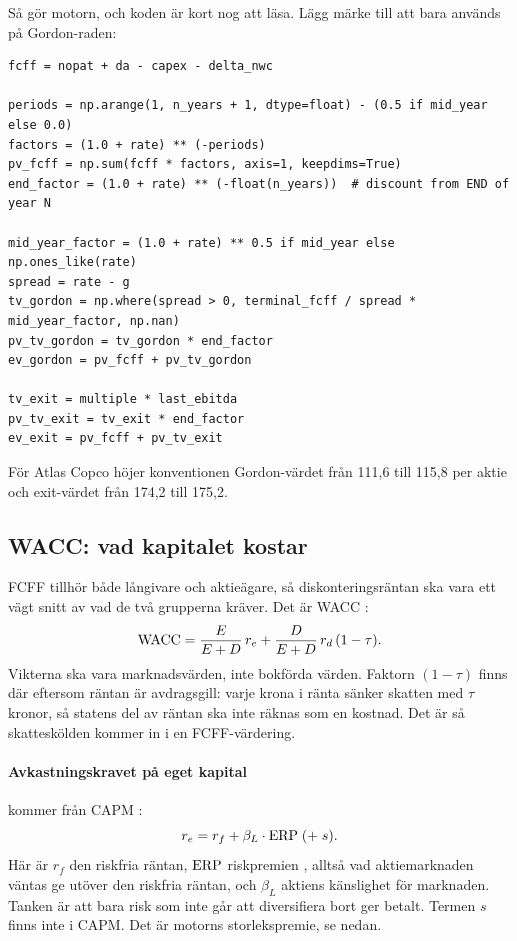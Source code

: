 Så gör motorn, och koden är kort nog att läsa. Lägg märke till att  bara
används på Gordon-raden:

\begin{lstlisting}[caption={Ur \texttt{dcf\_core} i \texttt{models/dcf.py} (förkortat).},label=lst:dcf]
fcff = nopat + da - capex - delta_nwc

periods = np.arange(1, n_years + 1, dtype=float) - (0.5 if mid_year else 0.0)
factors = (1.0 + rate) ** (-periods)
pv_fcff = np.sum(fcff * factors, axis=1, keepdims=True)
end_factor = (1.0 + rate) ** (-float(n_years))  # discount from END of year N

mid_year_factor = (1.0 + rate) ** 0.5 if mid_year else np.ones_like(rate)
spread = rate - g
tv_gordon = np.where(spread > 0, terminal_fcff / spread * mid_year_factor, np.nan)
pv_tv_gordon = tv_gordon * end_factor
ev_gordon = pv_fcff + pv_tv_gordon

tv_exit = multiple * last_ebitda
pv_tv_exit = tv_exit * end_factor
ev_exit = pv_fcff + pv_tv_exit
\end{lstlisting}

För Atlas Copco höjer konventionen Gordon-värdet från 111,6 till 115,8\kr{} per aktie och
exit-värdet från 174,2 till 175,2\kr.

\subsection{WACC: vad kapitalet kostar}
\label{sec:wacc}

FCFF tillhör både långivare och aktieägare, så diskonteringsräntan ska vara ett vägt snitt av
vad de två grupperna kräver. Det är WACC :
\begin{equation}
  \mathrm{WACC} = \frac{E}{E+D}\, r_e + \frac{D}{E+D}\, r_d\,(1-\tau).
  \label{eq:wacc}
\end{equation}
Vikterna ska vara marknadsvärden, inte bokförda värden. Faktorn $(1-\tau)$ finns där eftersom
räntan är avdragsgill: varje krona i ränta sänker skatten med $\tau$ kronor, så statens del av
räntan ska inte räknas som en kostnad. Det är så skatteskölden kommer in i en FCFF-värdering.

\paragraph{Avkastningskravet på eget kapital} kommer från CAPM :
\begin{equation}
  r_e = r_f + \beta_L \cdot \mathrm{ERP} \;(+\; s).
  \label{eq:capm}
\end{equation}
Här är $r_f$ den riskfria räntan, $\mathrm{ERP}$ riskpremien , alltså vad
aktiemarknaden väntas ge utöver den riskfria räntan, och $\beta_L$ aktiens känslighet för
marknaden. Tanken är att bara risk som inte går att diversifiera bort ger betalt. Termen $s$
finns inte i CAPM. Det är motorns storlekspremie, se nedan.

